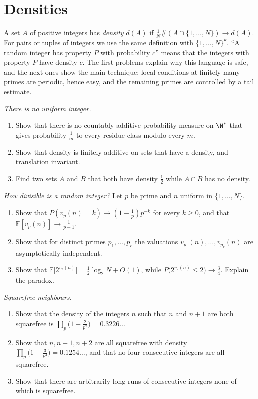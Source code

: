 \section{Densities}

A set $A$ of positive integers has \emph{density} $d(A)$ if $\frac1N\#(A\cap\{1,\dots,N\})\to d(A)$. For pairs or tuples of
integers we use the same definition with $\{1,\dots,N\}^k$. ``A random integer has property $P$ with probability $c$'' means that
the integers with property $P$ have density $c$. The first problems explain why this language is safe, and the next ones show
the main technique: local conditions at finitely many primes are periodic, hence easy, and the remaining primes are controlled
by a tail estimate.

\begin{exercise}[$\star$]\label{pb:nouniform}
\emph{There is no uniform integer.}
\begin{enumerate}[label=(\alph*)]
\item Show that there is no countably additive probability measure on $\N^*$ that gives probability $\frac1m$ to every residue
class modulo every $m$.
\item Show that density is finitely additive on sets that have a density, and translation invariant.
\item Find two sets $A$ and $B$ that both have density $\frac12$ while $A\cap B$ has no density.
\end{enumerate}
\end{exercise}

\begin{exercise}[$\star$]\label{pb:valuation}
\emph{How divisible is a random integer?} Let $p$ be prime and $n$ uniform in $\{1,\dots,N\}$.
\begin{enumerate}[label=(\alph*)]
\item Show that $P(v_p(n)=k)\to(1-\frac1p)p^{-k}$ for every $k\ge0$, and that $\mathbb E[v_p(n)]\to\frac1{p-1}$.
\item Show that for distinct primes $p_1,\dots,p_r$ the valuations $v_{p_1}(n),\dots,v_{p_r}(n)$ are asymptotically independent.
\item Show that $\mathbb E\bigl[2^{v_2(n)}\bigr]=\frac12\log_2N+O(1)$, while $P\bigl(2^{v_2(n)}\le2\bigr)\to\frac34$. Explain the
paradox.
\end{enumerate}
\end{exercise}

\begin{exercise}[$\star\star$]\label{pb:consecsqfree}
\emph{Squarefree neighbours.}
\begin{enumerate}[label=(\alph*)]
\item Show that the density of the integers $n$ such that $n$ and $n+1$ are both squarefree is
$\prod_p\bigl(1-\frac2{p^2}\bigr)=0.3226\ldots$
\item Show that $n,n+1,n+2$ are all squarefree with density $\prod_p\bigl(1-\frac3{p^2}\bigr)=0.1254\ldots$, and that no four
consecutive integers are all squarefree.
\item Show that there are arbitrarily long runs of consecutive integers none of which is squarefree.
\end{enumerate}
\end{exercise}

